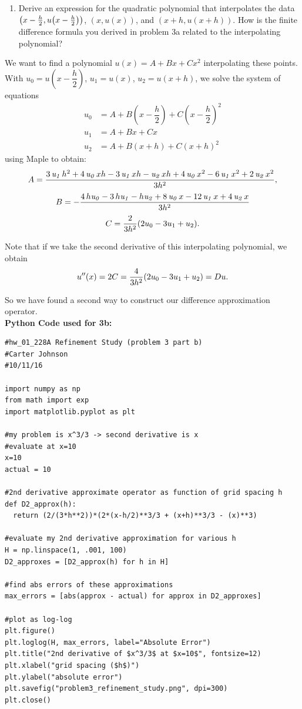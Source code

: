 \documentclass[12pt]{article}
\begin{document}
\begin{enumerate}[ \ \ (c)]
    \item Derive an expression for the quadratic polynomial that interpolates the data $\qty(x - \frac{h}{2}, u\qty(x - \frac{h}{2}))$, $(x, u(x))$, and $(x + h, u(x + h))$.  How is the finite difference formula you derived in problem 3a related to the interpolating polynomial?
    \end{enumerate}
We want to find a polynomial $u(x) = A + Bx + Cx^2$ interpolating these points. With $u_0 = u(x-\dfrac{h}{2})$, $u_1 = u(x)$, $u_2 = u(x+h)$,
we solve the system of equations 
\begin{align*}
u_0 &= A + B(x-\dfrac{h}{2}) + C(x-\dfrac{h}{2})^2 \\
u_1 &= A + Bx + Cx \\
u_2 &= A + B(x+h) + C(x+h)^2
\end{align*}
using Maple to obtain:
    $$A={\frac {3\,{\it u_1}\,{h}^{2}+4\,{\it u_0}\,xh-3\,{\it u_1}\,xh-{\it u_2}\,
xh+4\,{\it u_0}\,{x}^{2}-6\,{\it u_1}\,{x}^{2}+2\,{\it u_2}\,{x}^{2}}{3{h}^{2}}},$$ $$B=-
{\frac {4\,h{\it u_0}-3\,h{\it u_1}-h{\it u_2}+8\,{\it u_0}\,x-12\,{\it u_1}\,x+
4\,{\it u_2}\,x}{3{h}^{2}}}$$
$$C = \dfrac{2}{3h^2}\qty(2u_0-3u_1 + u_2).$$

Note that if we take the second derivative of this interpolating polynomial, we obtain 
$$u''(x) = 2C = \dfrac{4}{3h^2}\qty(2u_0-3u_1 + u_2) = Du.$$

So we have found a second way to construct our difference approximation operator. \\

\noindent \textbf{Python Code used for 3b:}
\begin{verbatim}
#hw_01_228A Refinement Study (problem 3 part b)
#Carter Johnson
#10/11/16

import numpy as np
from math import exp
import matplotlib.pyplot as plt

#my problem is x^3/3 -> second derivative is x
#evaluate at x=10
x=10
actual = 10

#2nd derivative approximate operator as function of grid spacing h
def D2_approx(h):
  return (2/(3*h**2))*(2*(x-h/2)**3/3 + (x+h)**3/3 - (x)**3)

#evaluate my 2nd derivative approximation for various h 
H = np.linspace(1, .001, 100)
D2_approxes = [D2_approx(h) for h in H]

#find abs errors of these approximations
max_errors = [abs(approx - actual) for approx in D2_approxes]

#plot as log-log
plt.figure()
plt.loglog(H, max_errors, label="Absolute Error")
plt.title("2nd derivative of $x^3/3$ at $x=10$", fontsize=12)
plt.xlabel("grid spacing ($h$)")
plt.ylabel("absolute error")
plt.savefig("problem3_refinement_study.png", dpi=300)
plt.close()
\end{verbatim}
\end{document}
